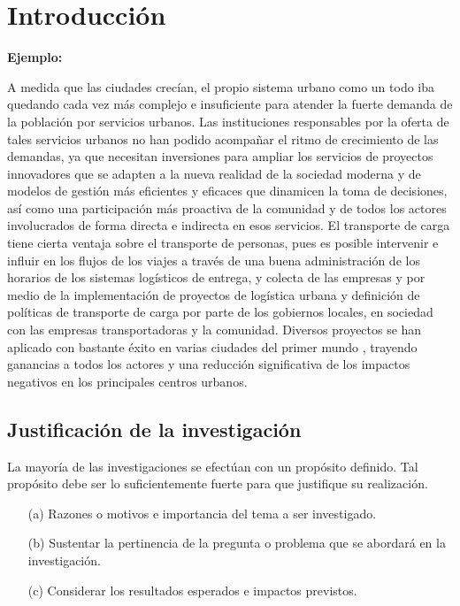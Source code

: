 \chapter{Introducción}
\setcounter{page}{1}
 


{\bf Ejemplo:}\par

A medida que las ciudades crecían, el propio sistema urbano como un todo iba quedando cada vez más complejo e insuficiente para atender la fuerte demanda de la población por servicios urbanos. Las instituciones responsables por la oferta de tales servicios urbanos no han podido acompañar el ritmo de crecimiento de las demandas, ya que necesitan inversiones para ampliar los servicios de proyectos innovadores que se adapten a la nueva realidad de la sociedad moderna y de modelos de gestión más eficientes y eficaces que dinamicen la toma de decisiones, así como una participación más proactiva de la comunidad y de todos los actores involucrados de forma directa e indirecta en esos servicios.   
\vskip 0.3cm
El transporte de carga tiene cierta ventaja sobre el transporte de personas, pues es posible intervenir e influir en los flujos de los viajes a través  de una buena administración de los horarios de los sistemas logísticos de entrega, y colecta de las empresas y por medio de la implementación de proyectos de logística urbana y definición de políticas de transporte de carga por parte de los gobiernos locales, en sociedad con las empresas transportadoras y la comunidad. Diversos proyectos se han aplicado con bastante éxito en varias ciudades del primer mundo \citep{Santos}, trayendo ganancias a todos los actores y una reducción significativa de los impactos negativos en los principales centros urbanos.    

\section{Justificación de la investigación}
La mayoría de las investigaciones se efectúan con un propósito definido. Tal propósito debe ser lo suficientemente fuerte para que justifique su realización. \cite{Erica}  

\begin{enumerate}
\item[(a)] Razones o motivos e importancia del tema a ser investigado. 
\item[(b)]Sustentar la pertinencia de la pregunta o problema que se abordará en la investigación.
\item[(c)]Considerar los resultados esperados e impactos previstos.
\end{enumerate}



